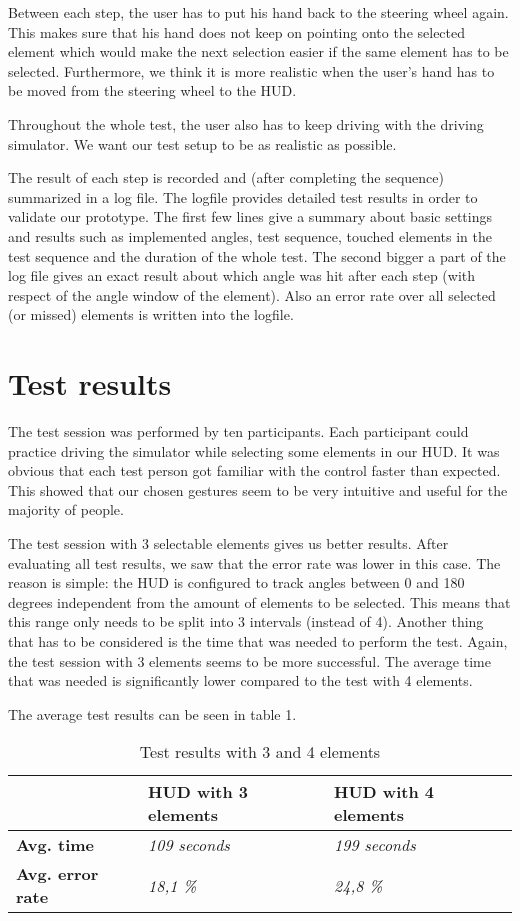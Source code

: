 \documentclass{sigchi-ext}
\begin{document}
Between each step, the user has to put his hand back to the steering wheel again. This makes sure that his hand does not keep on pointing onto the selected element which would make the next selection easier if the same element has to be selected. Furthermore, we think it is more realistic when the user's hand has to be moved from the steering wheel to the HUD.

Throughout the whole test, the user also has to keep driving with the driving simulator. We want our test setup to be as realistic as possible. 

The result of each step is recorded and (after completing the sequence) summarized in a log file. The logfile provides detailed test results in order to validate our prototype. The first few lines give a summary about basic settings and results such as implemented angles, test sequence, touched elements in the test sequence and the duration of the whole test. The second bigger a part of the log file gives an exact result about which angle was hit after each step (with respect of the angle window of the element). Also an error rate over all selected (or missed) elements is written into the logfile.

\section{Test results}
The test session was performed by ten participants.  Each participant could practice driving the simulator while selecting some elements in our HUD. It was obvious that each test person got familiar with the control faster than expected. This showed that our chosen gestures seem to be very intuitive and useful for the majority of people.

The test session with 3 selectable elements gives us better results. After evaluating all test results, we saw that the error rate was lower in this case. The reason is simple: the HUD is configured to track angles between 0 and 180 degrees independent from the amount of elements to be selected. This means that this range only needs to be split into 3 intervals (instead of 4). Another thing that has to be considered is the time that was needed to perform the test. Again, the test session with 3 elements seems to be more successful. The average time that was needed is significantly lower compared to the test with 4 elements.

The average test results can be seen in table 1.
\begin{table}
\begin{tabular}{|l|l|l|}
\hline
  & \textbf{HUD with 3 elements} & \textbf{HUD with 4 elements} \\
\hline
\textbf{Avg. time} & \textit{109 seconds} & \textit{199 seconds} \\
\hline
\textbf{Avg. error rate} & \textit{18,1 \%} & \textit{24,8 \%} \\
\hline
\end{tabular}
\caption{Test results with 3 and 4 elements}
\end{table}
\end{document}
